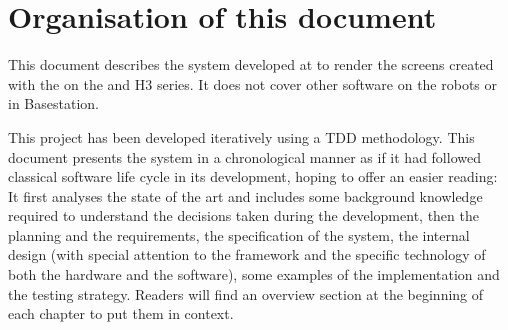 \section{Organisation of this document}
This document describes the system developed at \company to render the screens created with the \se on the  and H3 series.
It does not cover other software on the robots or in Basestation.

This project has been developed iteratively using a \ac{TDD} methodology. 
This document presents the system in a chronological manner as if it had followed classical software life cycle in its development, hoping to offer an easier reading:
It first analyses the state of the art and includes some background knowledge required to understand the decisions taken during the development, then the planning and the requirements, the specification of the system, the internal design (with special attention to the framework and the specific technology of both the hardware and the software), some examples of the implementation and the testing strategy.
Readers will find an overview section at the beginning of each chapter to put them in context.